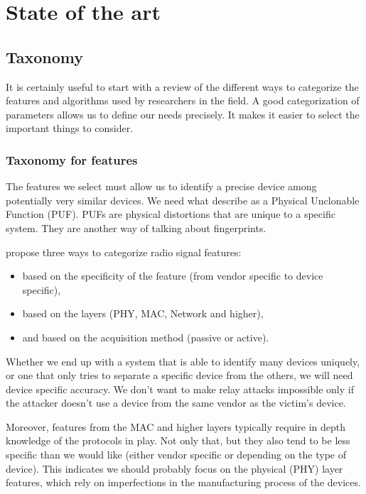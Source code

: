 \section{State of the art}

\subsection{Taxonomy}

It is certainly useful to start with a review of the different ways to categorize the features and algorithms used by researchers in the field. A good categorization of parameters allows us to define our needs precisely. It makes it easier to select the important things to consider.

\subsubsection{Taxonomy for features} \label{features_tax}

The features we select must allow us to identify a precise device among potentially very similar devices. We need what \textcite{delgado_passive_2020} describe as a Physical Unclonable Function (PUF). PUFs are physical distortions that are unique to a specific system. They are another way of talking about fingerprints.

\textcite{xu_device_2015} propose three ways to categorize radio signal features:

\begin{itemize}
  \item based on the specificity of the feature (from vendor specific to device specific),
  \item based on the layers (PHY, MAC, Network and higher),
  \item and based on the acquisition method (passive or active).
\end{itemize}

Whether we end up with a system that is able to identify many devices uniquely, or one that only tries to separate a specific device from the others, we will need device specific accuracy. We don't want to make relay attacks impossible only if the attacker doesn't use a device from the same vendor as the victim's device.

Moreover, features from the MAC and higher layers typically require in depth knowledge of the protocols in play. Not only that, but they also tend to be less specific than we would like (either vendor specific or depending on the type of device). This indicates we should probably focus on the physical (PHY) layer features, which rely on imperfections in the manufacturing process of the devices.


